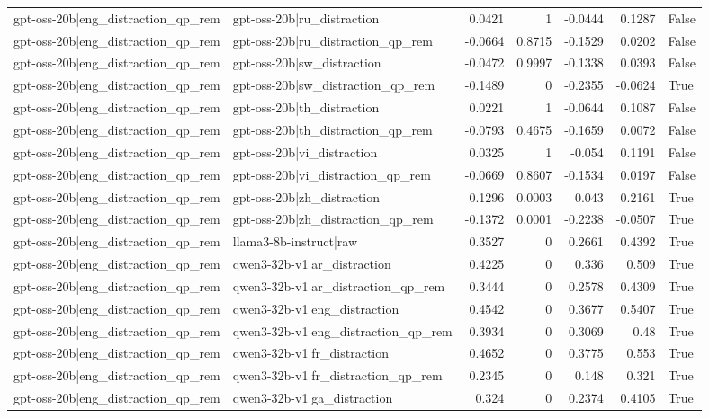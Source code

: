 \begin{table}
\begin{tabular}{l l r r r r l}
gpt-oss-20b|eng_distraction_qp_rem & gpt-oss-20b|ru_distraction & 0.0421 & 1 & -0.0444 & 0.1287 & False \\
gpt-oss-20b|eng_distraction_qp_rem & gpt-oss-20b|ru_distraction_qp_rem & -0.0664 & 0.8715 & -0.1529 & 0.0202 & False \\
gpt-oss-20b|eng_distraction_qp_rem & gpt-oss-20b|sw_distraction & -0.0472 & 0.9997 & -0.1338 & 0.0393 & False \\
gpt-oss-20b|eng_distraction_qp_rem & gpt-oss-20b|sw_distraction_qp_rem & -0.1489 & 0 & -0.2355 & -0.0624 & True \\
gpt-oss-20b|eng_distraction_qp_rem & gpt-oss-20b|th_distraction & 0.0221 & 1 & -0.0644 & 0.1087 & False \\
gpt-oss-20b|eng_distraction_qp_rem & gpt-oss-20b|th_distraction_qp_rem & -0.0793 & 0.4675 & -0.1659 & 0.0072 & False \\
gpt-oss-20b|eng_distraction_qp_rem & gpt-oss-20b|vi_distraction & 0.0325 & 1 & -0.054 & 0.1191 & False \\
gpt-oss-20b|eng_distraction_qp_rem & gpt-oss-20b|vi_distraction_qp_rem & -0.0669 & 0.8607 & -0.1534 & 0.0197 & False \\
gpt-oss-20b|eng_distraction_qp_rem & gpt-oss-20b|zh_distraction & 0.1296 & 0.0003 & 0.043 & 0.2161 & True \\
gpt-oss-20b|eng_distraction_qp_rem & gpt-oss-20b|zh_distraction_qp_rem & -0.1372 & 0.0001 & -0.2238 & -0.0507 & True \\
gpt-oss-20b|eng_distraction_qp_rem & llama3-8b-instruct|raw & 0.3527 & 0 & 0.2661 & 0.4392 & True \\
gpt-oss-20b|eng_distraction_qp_rem & qwen3-32b-v1|ar_distraction & 0.4225 & 0 & 0.336 & 0.509 & True \\
gpt-oss-20b|eng_distraction_qp_rem & qwen3-32b-v1|ar_distraction_qp_rem & 0.3444 & 0 & 0.2578 & 0.4309 & True \\
gpt-oss-20b|eng_distraction_qp_rem & qwen3-32b-v1|eng_distraction & 0.4542 & 0 & 0.3677 & 0.5407 & True \\
gpt-oss-20b|eng_distraction_qp_rem & qwen3-32b-v1|eng_distraction_qp_rem & 0.3934 & 0 & 0.3069 & 0.48 & True \\
gpt-oss-20b|eng_distraction_qp_rem & qwen3-32b-v1|fr_distraction & 0.4652 & 0 & 0.3775 & 0.553 & True \\
gpt-oss-20b|eng_distraction_qp_rem & qwen3-32b-v1|fr_distraction_qp_rem & 0.2345 & 0 & 0.148 & 0.321 & True \\
gpt-oss-20b|eng_distraction_qp_rem & qwen3-32b-v1|ga_distraction & 0.324 & 0 & 0.2374 & 0.4105 & True \\

\end{tabular}
\end{table}
